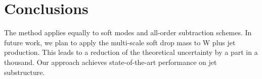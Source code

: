\section{Conclusions}\label{sec:conclusions}

The method applies equally to soft modes and all-order subtraction
schemes. In future work, we plan to apply the multi-scale soft drop mass
to W plus jet production. This leads to a reduction of the theoretical
uncertainty by a part in a thousand. Our approach achieves
state-of-the-art performance on jet substructure.


